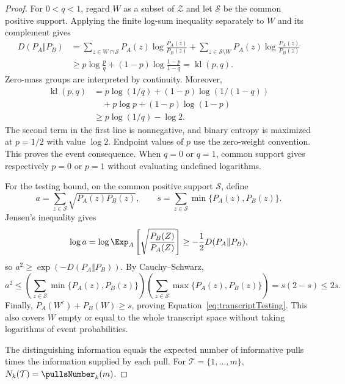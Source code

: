 \begin{proof}
For $0<q<1$, regard $W$ as a subset of $\mathcal Z$ and let
$\mathcal S$ be the common positive support. Applying the finite
log-sum inequality separately to $W$ and its complement gives
\begin{align*}
D(P_A\Vert P_B)
&=\sum_{z\in W\cap\mathcal S}P_A(z)\log\frac{P_A(z)}{P_B(z)}
+\sum_{z\in\mathcal S\setminus W}P_A(z)\log\frac{P_A(z)}{P_B(z)}\\
&\geq p\log\frac{p}{q}+(1-p)\log\frac{1-p}{1-q}
=\operatorname{kl}(p,q).
\end{align*}
Zero-mass groups are interpreted by continuity. Moreover,
\begin{align*}
\operatorname{kl}(p,q)
&=p\log(1/q)+(1-p)\log(1/(1-q))\\
&\quad+p\log p+(1-p)\log(1-p)\\
&\geq p\log(1/q)-\log2.
\end{align*}
The second term in the first line is nonnegative, and binary entropy
is maximized at $p=1/2$ with value $\log2$. Endpoint values of $p$ use the
zero-weight convention. This proves the event consequence.
When $q=0$ or $q=1$, common support gives respectively $p=0$ or $p=1$
without evaluating undefined logarithms.

For the testing bound, on the common positive support $\mathcal S$,
define
\[
a=\sum_{z\in\mathcal S}\sqrt{P_A(z)P_B(z)},\qquad
s=\sum_{z\in\mathcal S}\min\{P_A(z),P_B(z)\}.
\]
Jensen's inequality gives
\[
\log a
=\log\Exp_A\left[\sqrt{\frac{P_B(Z)}{P_A(Z)}}\right]
\geq-\frac12D(P_A\Vert P_B),
\]
so $a^2\geq\exp(-D(P_A\Vert P_B))$. By Cauchy--Schwarz,
\[
a^2\leq
\left(\sum_{z\in\mathcal S}\min\{P_A(z),P_B(z)\}\right)
\left(\sum_{z\in\mathcal S}\max\{P_A(z),P_B(z)\}\right)
=s(2-s)\leq2s.
\]
Finally, $P_A(W^c)+P_B(W)\geq s$, proving
Equation~\ref{eq:transcriptTesting}. This also covers $W$ empty or
equal to the whole transcript space without taking logarithms of
event probabilities.

The distinguishing information equals the expected number of
informative pulls times the information supplied by each pull.
For $\mathcal T=\{1,\ldots,m\}$, $N_k(\mathcal T)=\pullsNumber_k(m)$.
\end{proof}
